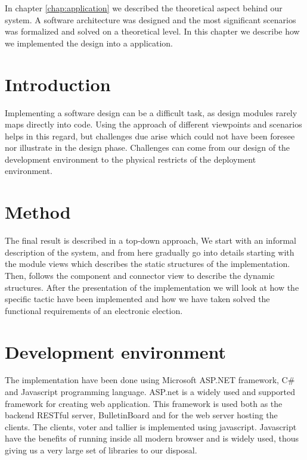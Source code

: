 In chapter \ref{chap:application} we described the theoretical aspect behind our system. A software architecture was designed and the most significant scenarios was formalized and solved on a theoretical level. In this chapter we describe how we implemented the design into a application.    

\section{Introduction}
Implementing a software design can be a difficult task, as design modules rarely maps directly into code. Using the approach of different viewpoints and scenarios helps in this regard, but challenges due arise which could not have been foresee nor illustrate in the design phase. Challenges can come from our design of the development environment to the physical restricts of the deployment environment. 

\section{Method}
The final result is described in a top-down approach, We start with an informal description of the system, and from here gradually go into details starting with the module views which describes the static structures of the implementation. Then, follows the component and connector view to describe the dynamic structures. After the presentation of the implementation we will look at how the specific tactic have been implemented and how we have taken solved the functional requirements of an electronic election.

\section{Development environment}
The implementation have been done using Microsoft ASP.NET framework, C\# and Javascript programming language. ASP.net is a widely used and supported framework for creating web application. This framework is used both as the backend RESTful server, BulletinBoard and for the web server hosting the clients. The clients, voter and tallier is implemented using javascript. Javascript have the benefits of running inside all modern browser and is widely used, thous giving us a very large set of libraries to our disposal. \\


